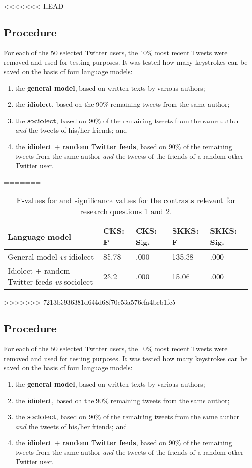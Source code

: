 \documentclass[11pt]{article}
\begin{document}
<<<<<<< HEAD
\subsection{Procedure}
For each of the 50 selected Twitter users, the 10\% most recent Tweets were removed and used for testing purposes. It was tested how many keystrokes can be saved on the basis of four language models:

\begin{enumerate}
\item the \textbf{general model}, based on written texts by various authors;
\item the \textbf{idiolect}, based on the 90\% remaining tweets from the same author;
\item the \textbf{sociolect}, based on 90\% of the remaining tweets from the same author \emph{and} the tweets of his/her friends; and
\item the \textbf{idiolect $+$ random Twitter feeds}, based on 90\% of the remaining tweets from the same author \emph{and} the tweets of the friends of a random other Twitter user.
\end{enumerate}
=======
\begin{table*}[t]
\begin{tabular}{l|ll|ll|}
Language model&CKS: F&CKS: Sig.&SKKS: F&SKKS: Sig.\\
\hline
General model \emph{vs} idiolect & 85.78 & .000 & 135.38 & .000 \\
Idiolect $+$ random Twitter feeds \emph{vs} sociolect & 23.2 & .000 & 15.06 & .000\\
\end{tabular}
\caption{F-values for and significance values for the contrasts relevant for research questions 1 and 2.}
\label{stat}
\end{table*}
>>>>>>> 7213b3936381d644d68f70c53a576efa4bcb1fc5

\subsection{Procedure}
For each of the 50 selected Twitter users, the 10\% most recent Tweets were removed and used for testing purposes. It was tested how many keystrokes can be saved on the basis of four language models:

\begin{enumerate}
\item the \textbf{general model}, based on written texts by various authors;
\item the \textbf{idiolect}, based on the 90\% remaining tweets from the same author;
\item the \textbf{sociolect}, based on 90\% of the remaining tweets from the same author \emph{and} the tweets of his/her friends; and
\item the \textbf{idiolect $+$ random Twitter feeds}, based on 90\% of the remaining tweets from the same author \emph{and} the tweets of the friends of a random other Twitter user.
\end{enumerate}
\end{document}
